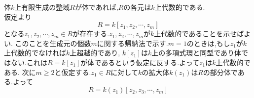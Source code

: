 \documentclass[dvipdfmx,a4paper,11pt]{jsarticle}
\begin{document}
\begin{tcolorbox}[title = 補題1.7,upperbox = visible]
  体$k$上有限生成の整域$R$が体であれば,$R$の各元は$k$上代数的である.
  \tcblower
  \\
  仮定より
  \begin{equation}
    R=k[z_{1},z_{2},\cdots,z_{m}]
  \end{equation}
  となる$z_{1},z_{2},\cdots,z_{m}\in R$が存在する.$z_{1},z_{2},\cdots,z_{m}$が$k$上代数的であることを示せばよい.
  このことを生成元の個数$m$に関する帰納法で示す.$m=1$のときは,もし$z_{1}$が$k$上代数的でなければ$k$上超越的であり,
  $k[z_{1}]$は$k$上の多項式環と同型であり体ではない.これは$R=k[z_{1}]$が体であるという仮定に反する.よって$z_{1}$は$k$上代数的である.
  次に$m\geq 2$と仮定する.$z_{1}\in R$に対して$k$の拡大体$k(z_{1})$は$R$の部分体である.よって
  \begin{equation*}
    R=k(z_{1})[z_{2},z_{3},\cdots,z_{m}]
  \end{equation*}
  
\end{tcolorbox}
\end{document}
